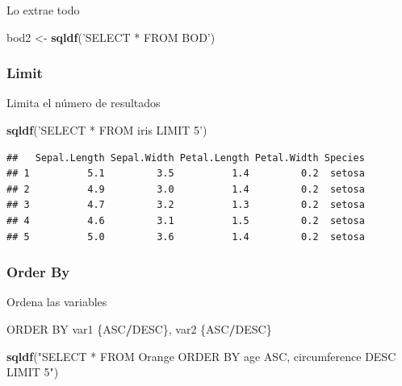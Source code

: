 \documentclass[
]{book}
\newenvironment{Shaded}{\begin{snugshade}}{\end{snugshade}}
\newcommand{\KeywordTok}[1]{\textcolor[rgb]{0.13,0.29,0.53}{\textbf{#1}}}
\newcommand{\NormalTok}[1]{#1}
\newcommand{\OperatorTok}[1]{\textcolor[rgb]{0.81,0.36,0.00}{\textbf{#1}}}
\newcommand{\StringTok}[1]{\textcolor[rgb]{0.31,0.60,0.02}{#1}}
\begin{document}
Lo extrae todo

\begin{Shaded}
\begin{Highlighting}[]
\NormalTok{bod2 <-}\StringTok{ }\KeywordTok{sqldf}\NormalTok{(}\StringTok{'SELECT * FROM BOD'}\NormalTok{)}
\end{Highlighting}
\end{Shaded}

\hypertarget{limit}{%
\subsubsection{Limit}\label{limit}}

Limita el número de resultados

\begin{Shaded}
\begin{Highlighting}[]
\KeywordTok{sqldf}\NormalTok{(}\StringTok{'SELECT * FROM iris LIMIT 5'}\NormalTok{)}
\end{Highlighting}
\end{Shaded}

\begin{verbatim}
##   Sepal.Length Sepal.Width Petal.Length Petal.Width Species
## 1          5.1         3.5          1.4         0.2  setosa
## 2          4.9         3.0          1.4         0.2  setosa
## 3          4.7         3.2          1.3         0.2  setosa
## 4          4.6         3.1          1.5         0.2  setosa
## 5          5.0         3.6          1.4         0.2  setosa
\end{verbatim}

\hypertarget{order-by}{%
\subsubsection{Order By}\label{order-by}}

Ordena las variables

\begin{Shaded}
\begin{Highlighting}[]
\NormalTok{ORDER BY var1 \{ASC}\OperatorTok{/}\NormalTok{DESC\}, var2 \{ASC}\OperatorTok{/}\NormalTok{DESC\}}
\end{Highlighting}
\end{Shaded}

\begin{Shaded}
\begin{Highlighting}[]
\KeywordTok{sqldf}\NormalTok{(}\StringTok{"SELECT * FROM Orange ORDER BY age ASC, circumference DESC LIMIT 5"}\NormalTok{)}
\end{Highlighting}
\end{Shaded}
\end{document}
